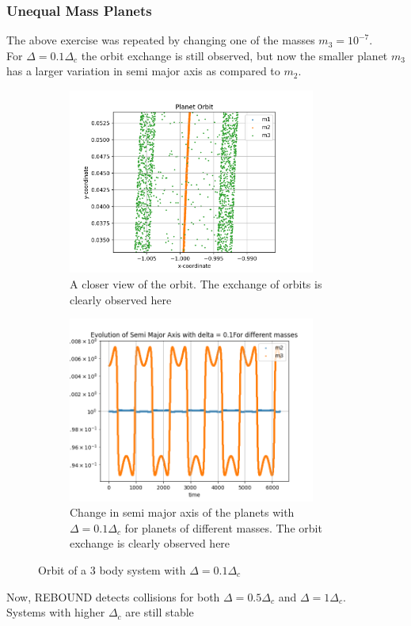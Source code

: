 \documentclass[12pt,a4paper]{article}
\begin{document}
\subsubsection{Unequal Mass Planets}
The above exercise was repeated by changing one of the masses $m_3= 10^{-7}$. \\
For $\Delta=0.1\Delta_c$ the orbit exchange is still observed, but now the smaller planet $m_3$ has a larger variation in semi major axis as compared to $m_2$.
\begin{figure}[H]
  \centering
  \begin{subfigure}{0.49\textwidth}
    \centering
    \includegraphics[height = 2.4in]{3Body/3BD_orbit_delta0.1_Close_2.png}
    \caption{A closer view of the orbit. The exchange of orbits is clearly observed here}
    \label{fig:3Body_0.1_close}
  \end{subfigure}

  \begin{subfigure}{0.49\textwidth}
    \centering
    \includegraphics[height = 2.4in]{3Body/3BD_a_delta_20.1.png}
    \caption{Change in semi major axis of the planets with $\Delta = 0.1\Delta_c$ for planets of different masses. The orbit exchange is clearly observed here}
    \label{fig:3Body_0.1_close}
  \end{subfigure}
  \caption{Orbit of a 3 body system with $\Delta = 0.1\Delta_c$}
\end{figure}
Now, REBOUND detects collisions for both $\Delta=0.5\Delta_c$ and $\Delta=1\Delta_c$.\\
Systems with higher $\Delta_c$ are still stable
\end{document}
